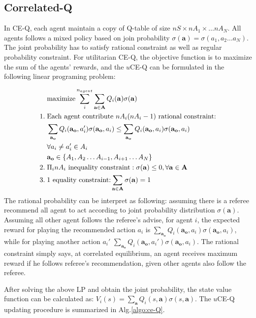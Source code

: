 \documentclass[conference]{IEEEtran}
\begin{document}
\subsection{Correlated-Q}
In CE-Q, each agent maintain a copy of Q-table of size $nS\times nA_1 \times\dots nA_N$. All agents follows a mixed policy based on join probability $\sigma(\mathbf{a}) = \sigma(a_1, a_2 \dots a_N)$. The joint probability has to satisfy rational constraint as well as regular probability constraint. For utilitarian CE-Q, the objective function is to maximize the sum of the agents’ rewards, and the $u$CE-Q can be formulated in the following linear programing problem:

\begin{align}
&\text{maximize} \sum_i^{n_{agent}} \sum_{\mathbf{a}\in\mathbf{A}} Q_i(\mathbf{a}) \sigma(\mathbf{a}) \notag \\
1.\; & \text{Each agent contribute $nA_i(nA_i-1)$ rational constraint:} \notag\\
& \sum_{\mathbf{a_o}} Q_i(\mathbf{a_o}, a_i')\sigma(\mathbf{a_o}, a_i) \le \sum_{\mathbf{a_o}}  Q_i(\mathbf{a_o}, a_i)  \sigma(\mathbf{a_o}, a_i) \notag \\
& \forall a_i\neq a_i' \in A_i  \notag \\
& \mathbf{a_o} \in \{ A_1, A_2 \dots A_{i-1}, A_{i+1} \dots A_{N} \} \notag \\
2.\; & \text{$\Pi_i  nA_i$ inequality constraint}: \sigma(\mathbf{a})\le 0,  \forall \mathbf{a}\in\mathbf{A}\notag \\
3.\; &\text{1 equality constraint:} \sum_{\mathbf{a}\in\mathbf{A}} \sigma(\mathbf{a}) = 1
\end{align}
The rational probability can be interpret as following: assuming there is a referee recommend all agent to act according to joint probability distribution $\sigma(\mathbf{a})$. Assuming all other agent follows the referee's advise, for agent $i$, the expected reward for playing the recommended action $a_i$ is $\sum_{\mathbf{a_o}}  Q_i(\mathbf{a_o}, a_i)  \sigma(\mathbf{a_o}, a_i)$, while for playing another action $a_i'$ $\sum_{\mathbf{a_o}}  Q_i(\mathbf{a_o}, a_i')  \sigma(\mathbf{a_o}, a_i)$. The rational constraint simply says, at correlated equilibrium, an agent receives maximum reward if he follows referee's recommendation, given other agents also follow the referee.

After solving the above LP and obtain the joint probability, the state value function can be calculated as: $V_i(s) = \sum_{\mathbf{a}} Q_i(s, \mathbf{a}) \sigma(s, \mathbf{a})$. The $u$CE-Q updating procedure is summarized in Alg.\ref{algo:ce-Q}.
\end{document}
